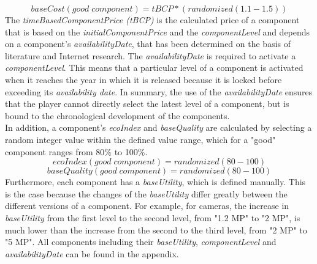 \begin{equation}
    baseCost(good \; component) = tBCP * (randomized(1.1-1.5))
\end{equation}
The \textit{timeBasedComponentPrice (tBCP)} is the calculated price of a component that is based on the \textit{initialComponentPrice} and the \textit{componentLevel} and depends on a component's \textit{availabilityDate}, that has been determined on the basis of literature and Internet research. The \textit{availabilityDate} is required to activate a \textit{componentLevel}. This means that a particular level of a component is activated when it reaches the year in which it is released because it is locked before exceeding its \textit{availability date}. In summary, the use of the \textit{availabilityDate} ensures that the player cannot directly select the latest level of a component, but is bound to the chronological development of the components.\\
In addition, a component's \textit{ecoIndex} and \textit{baseQuality} are calculated by selecting a random integer value within the defined value range, which for a "good" component ranges from 80\% to 100\%.
\begin{equation}
    ecoIndex(good \; component) = randomized(80-100)
\end{equation}
\begin{equation}
    baseQuality(good \; component) = randomized(80-100)
\end{equation}
Furthermore, each component has a \textit{baseUtility}, which is defined manually. This is the case because the changes of the \textit{baseUtility} differ greatly between the different versions of a component. For example, for cameras, the increase in \textit{baseUtility} from the first level to the second level, from "1.2 MP" to "2 MP", is much lower than the increase from the second to the third level, from "2 MP" to "5 MP". All components including their \textit{baseUtility}, \textit{componentLevel} and \textit{availabilityDate} can be found in the appendix. %

